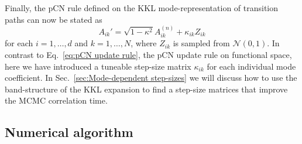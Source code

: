 Finally, the pCN rule defined on the KKL mode-representation of transition paths can now be stated as
		\begin{equation}
			A_{ik}' = \sqrt{1 - \kappa^2} A_{ik}^{(n)} + \kappa_{ik} Z_{ik}
		\end{equation}
for each $i=1,\dots,d$ and $k = 1,\dots,N$, where $Z_{ik}$ is sampled from $\mathcal{N}(0,1)$. In contrast to Eq.~\ref{eq:pCN update rule}, the pCN update rule on functional space, here we have introduced a tuneable step-size matrix $\kappa_{ik}$ for each individual mode coefficient. In Sec.~\ref{sec:Mode-dependent step-sizes} we will discuss how to use the band-structure of the KKL expansion to find a step-size matrices that improve the MCMC correlation time.  %

\subsection{Numerical algorithm} \label{sec:pCN Numerical algorithm summary}


